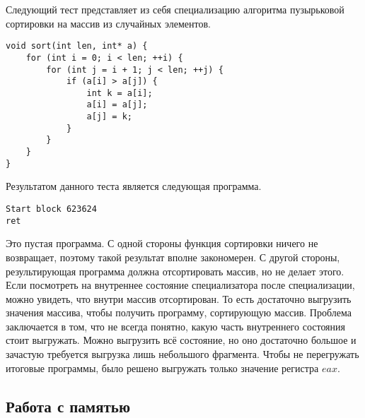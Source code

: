 \documentclass{spbau-diploma}
\begin{document}
Следующий тест представляет из себя специализацию алгоритма пузырьковой сортировки на массив из случайных элементов.
\begin{lstlisting}
void sort(int len, int* a) {
    for (int i = 0; i < len; ++i) {
        for (int j = i + 1; j < len; ++j) {
            if (a[i] > a[j]) {
                int k = a[i];
                a[i] = a[j];
                a[j] = k;
            }
        }
    }
}
\end{lstlisting}
Результатом данного теста является следующая программа.
\begin{lstlisting}
Start block 623624
ret
\end{lstlisting}
Это пустая программа. С одной стороны функция сортировки ничего не возвращает, поэтому такой результат вполне закономерен. С другой стороны, результирующая программа должна отсортировать массив, но не делает этого. Если посмотреть на внутреннее состояние специализатора после специализации, можно увидеть, что внутри массив отсортирован. То есть достаточно выгрузить значения массива, чтобы получить программу, сортирующую массив. Проблема заключается в том, что не всегда понятно, какую часть внутреннего состояния стоит выгружать. Можно выгрузить всё состояние, но оно достаточно большое и зачастую требуется выгрузка лишь небольшого фрагмента. Чтобы не перегружать итоговые программы, было решено выгружать только значение регистра $eax$.

\subsection{ Работа с памятью}
\end{document}
